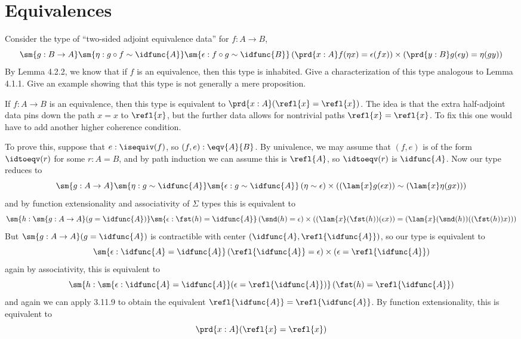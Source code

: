 \begin{coqdoccode}
\end{coqdoccode}
\section{Equivalences}



Consider the type of ``two-sided adjoint equivalence data'' for $f : A \to B$,
\[
  \sm{g:B \to A} 
  \sm{\eta : g \circ f \sim \idfunc{A}}
  \sm{\epsilon : f \circ g \sim \idfunc{B}}
  \left(\prd{x:A} f(\eta x) = \epsilon(f x)\right)
    \times
  \left(\prd{y:B} g(\epsilon y) = \eta(g y)\right)
\]
By Lemma 4.2.2, we know that if $f$ is an equivalence, then this type is
inhabited.  Give a characterization of this type analogous to Lemma 4.1.1.
Give an example showing that this type is not generally a mere proposition.


 \soln
If $f : A \to B$ is an equivalence, then this type is equivalent to
$\prd{x:A}(\refl{x} = \refl{x})$.  The idea is that the extra half-adjoint
data pins down the path $x = x$ to $\refl{x}$, but the further data allows for
nontrivial paths $\refl{x} = \refl{x}$. To fix this one would have to
add another higher coherence condition.


To prove this, suppose that $e : \isequiv(f)$, so $(f, e) : \eqv{A}{B}$.  By
univalence, we may assume that $(f, e)$ is of the form $\idtoeqv(r)$ for some
$r : A = B$, and by path induction we can assume this is $\refl{A}$, so
$\idtoeqv(r)$ is $\idfunc{A}$.  Now our type reduces to
\[
  \sm{g:A \to A} 
  \sm{\eta : g \sim \idfunc{A}}
  \sm{\epsilon : g \sim \idfunc{A}}
  \left(\eta \sim \epsilon \right)
    \times
  \left((\lam{x}g(\epsilon x)) \sim (\lam{x}\eta(g x))\right)
\]
and by function extensionality and associativity of $\Sigma$ types this is
equivalent to 
\[
  \sm{h : \sm{g:A \to A} (g = \idfunc{A})}
  \sm{\epsilon : \fst(h) = \idfunc{A}}
  \left(\snd(h) = \epsilon \right)
    \times
  \left((\lam{x}(\fst(h))(\epsilon x)) = (\lam{x}(\snd(h))((\fst(h)) x))\right)
\]
But $\sm{g : A \to A}(g = \idfunc{A})$ is contractible with center
$(\idfunc{A}, \refl{\idfunc{A}})$, so our type is equivalent to
\[
  \sm{\epsilon : \idfunc{A} = \idfunc{A}}
  \left(\refl{\idfunc{A}} = \epsilon \right)
    \times
  \left(\epsilon = \refl{\idfunc{A}}\right)
\]
again by associativity, this is equivalent to 
\[
  \sm{h: \sm{\epsilon : \idfunc{A} = \idfunc{A}} (\epsilon =
  \refl{\idfunc{A}})}
  \left(\fst(h) = \refl{\idfunc{A}}\right)
\]
and again we can apply 3.11.9 to obtain the equivalent $\refl{\idfunc{A}} =
\refl{\idfunc{A}}$.  By function extensionality, this is equivalent to
\[
  \prd{x:A}(\refl{x} = \refl{x})
\]


